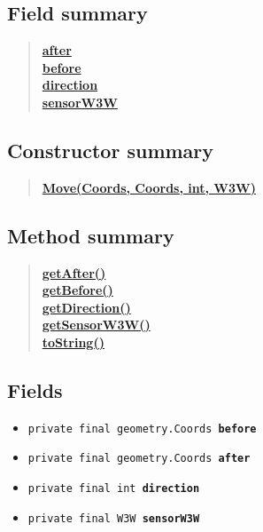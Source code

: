 \documentclass[11pt,a4paper]{report}
\begin{document}
{{{{{\subsection{Field summary}{
\begin{verse}
\hyperlink{uk.ac.ed.inf.aqmaps.Move.after}{{\bf after}} \\
\hyperlink{uk.ac.ed.inf.aqmaps.Move.before}{{\bf before}} \\
\hyperlink{uk.ac.ed.inf.aqmaps.Move.direction}{{\bf direction}} \\
\hyperlink{uk.ac.ed.inf.aqmaps.Move.sensorW3W}{{\bf sensorW3W}} \\
\end{verse}
}
\subsection{Constructor summary}{
\begin{verse}
\hyperlink{uk.ac.ed.inf.aqmaps.Move(uk.ac.ed.inf.aqmaps.geometry.Coords, uk.ac.ed.inf.aqmaps.geometry.Coords, int, uk.ac.ed.inf.aqmaps.W3W)}{{\bf Move(Coords, Coords, int, W3W)}} \\
\end{verse}
}
\subsection{Method summary}{
\begin{verse}
\hyperlink{uk.ac.ed.inf.aqmaps.Move.getAfter()}{{\bf getAfter()}} \\
\hyperlink{uk.ac.ed.inf.aqmaps.Move.getBefore()}{{\bf getBefore()}} \\
\hyperlink{uk.ac.ed.inf.aqmaps.Move.getDirection()}{{\bf getDirection()}} \\
\hyperlink{uk.ac.ed.inf.aqmaps.Move.getSensorW3W()}{{\bf getSensorW3W()}} \\
\hyperlink{uk.ac.ed.inf.aqmaps.Move.toString()}{{\bf toString()}} \\
\end{verse}
}
\subsection{Fields}{
\begin{itemize}
\item{
\label{uk.ac.ed.inf.aqmaps.Move.before}\hypertarget{uk.ac.ed.inf.aqmaps.Move.before}{\texttt{private final geometry.Coords\ {\bf  before}}
}
}
\item{
\label{uk.ac.ed.inf.aqmaps.Move.after}\hypertarget{uk.ac.ed.inf.aqmaps.Move.after}{\texttt{private final geometry.Coords\ {\bf  after}}
}
}
\item{
\label{uk.ac.ed.inf.aqmaps.Move.direction}\hypertarget{uk.ac.ed.inf.aqmaps.Move.direction}{\texttt{private final int\ {\bf  direction}}
}
}
\item{
\label{uk.ac.ed.inf.aqmaps.Move.sensorW3W}\hypertarget{uk.ac.ed.inf.aqmaps.Move.sensorW3W}{\texttt{private final W3W\ {\bf  sensorW3W}}
}
}
\end{itemize}
}
}}}}}
\end{document}
